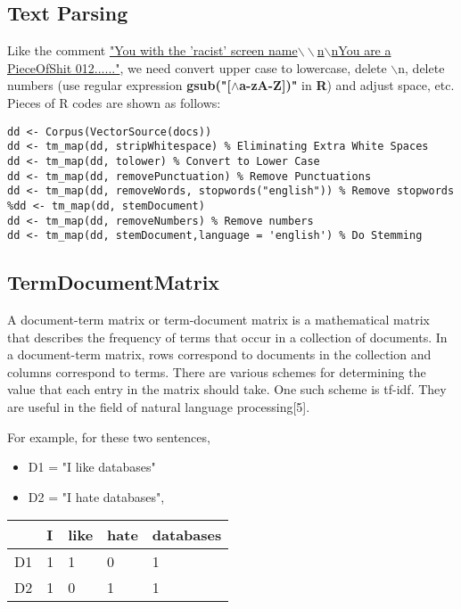 \documentclass[11pt]{article}
\begin{document}
\begin{singlespacing}
\subsection{Text Parsing}
Like the comment \underline{"You with the 'racist' screen name$\backslash\backslash$n$\backslash$nYou are a PieceOfShit 012......"}, we need convert upper case to lowercase, delete $\backslash$n, delete numbers (use regular expression \textbf{gsub("[$\wedge$a-zA-Z])"} in \textbf{R}) and adjust space, etc. Pieces of R codes are shown as follows:

\begin{verbatim}
dd <- Corpus(VectorSource(docs))
dd <- tm_map(dd, stripWhitespace) % Eliminating Extra White Spaces
dd <- tm_map(dd, tolower) % Convert to Lower Case
dd <- tm_map(dd, removePunctuation) % Remove Punctuations
dd <- tm_map(dd, removeWords, stopwords("english")) % Remove stopwords
%dd <- tm_map(dd, stemDocument) 
dd <- tm_map(dd, removeNumbers) % Remove numbers
dd <- tm_map(dd, stemDocument,language = 'english') % Do Stemming
\end{verbatim}

\subsection{TermDocumentMatrix}
A document-term matrix or term-document matrix is a mathematical matrix that describes the frequency of terms that occur in a collection of documents. In a document-term matrix, rows correspond to documents in the collection and columns correspond to terms. There are various schemes for determining the value that each entry in the matrix should take. One such scheme is tf-idf. They are useful in the field of natural language processing[5].

For example, for these two sentences,
\begin{itemize}
\item D1 = "I like databases"
\item D2 = "I hate databases",
\end{itemize}

\begin{center}
\begin{tabular}{|p{2cm}|p{2cm}|p{2cm}|p{2cm}|p{2cm}|}
\hline         
      & I   & like & hate & databases\\ \hline
D1 & 1 & 1      & 0      & 1 \\ \hline
D2 & 1 & 0      & 1      & 1 \\ 
\hline
\end{tabular}
\end{center}


\end{singlespacing}
\end{document}
